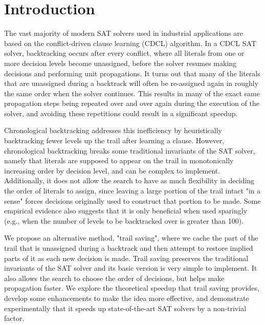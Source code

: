 \documentclass{article}
\begin{document}
\begin{abstract}
\end{abstract}

\section{Introduction}
The vast majority of modern SAT solvers used in industrial applications are based on the conflict-driven clause learning (CDCL) algorithm. In a CDCL SAT solver, backtracking occurs after every conflict, where all literals from one or more decision levels become unassigned, before the solver resumes making decisions and performing unit propagations. It turns out that many of the literals that are unassigned during a backtrack will often be re-assigned again in roughly the same order when the solver continues. This results in many of the exact same propagation steps being repeated over and over again during the execution of the solver, and avoiding these repetitions could result in a significant speedup.

Chronological backtracking \cite{DBLP:conf/lpar/2013, DBLP:conf/sat/MohleB19, DBLP:conf/sat/NadelR18} addresses this inefficiency by heuristically backtracking fewer levels up the trail after learning a clause. However, chronological backtracking breaks some traditional invariants of the SAT solver, namely that literals are supposed to appear on the trail in monotonically increasing order by decision level, and can be complex to implement. Additionally, it does not allow the search to have as much flexibility in deciding the order of literals to assign, since leaving a large portion of the trail intact "in a sense" forces decisions originally used to construct that portion to be made. Some empirical evidence also suggests that it is only beneficial when used sparingly (e.g., when the number of levels to be backtracked over is greater than 100).

We propose an alternative method, "trail saving", where we cache the part of the trail that is unassigned during a backtrack and then attempt to restore implied parts of it as each new decision is made. Trail saving preserves the traditional invariants of the SAT solver and its basic version is very simple to implement. It also allows the search to choose the order of decisions, but helps make propagation faster. We explore the theoretical speedup that trail saving provides, develop some enhancements to make the idea more effective, and demonstrate experimentally that it speeds up state-of-the-art SAT solvers by a non-trivial factor.
\end{document}
